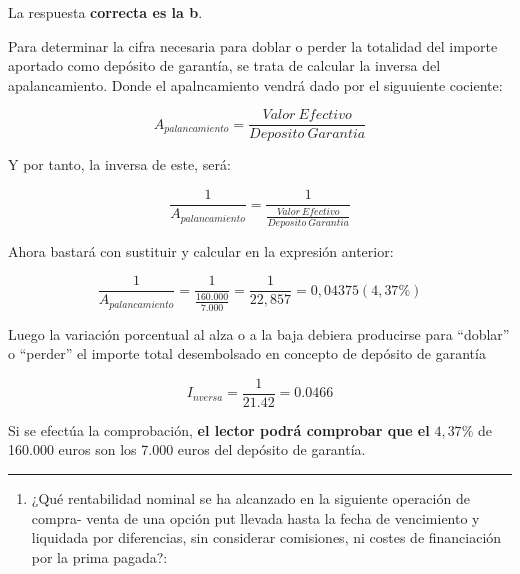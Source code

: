 \documentclass[
  letterpaper,
  DIV=11,
  numbers=noendperiod]{scrreprt}
\providecommand{\tightlist}{%
  \setlength{\itemsep}{0pt}\setlength{\parskip}{0pt}}\usepackage{longtable,booktabs,array}
\begin{document}
\begin{tcolorbox}[enhanced jigsaw, left=2mm, opacityback=0, colback=white, breakable, arc=.35mm, bottomrule=.15mm, rightrule=.15mm, toprule=.15mm, leftrule=.75mm, colframe=quarto-callout-tip-color-frame]
\begin{minipage}[t]{5.5mm}
\textcolor{quarto-callout-tip-color}{\faLightbulb}
\end{minipage}%
\begin{minipage}[t]{\textwidth - 5.5mm}

La respuesta \textbf{correcta es la b}.

Para determinar la cifra necesaria para doblar o perder la totalidad del
importe aportado como depósito de garantía, se trata de calcular la
inversa del apalancamiento. Donde el apalncamiento vendrá dado por el
siguuiente cociente:

\[A_{palancamiento}=\frac{Valor\ Efectivo}{Deposito\ Garantia}\]

Y por tanto, la inversa de este, será:

\[\frac {1}{A_{palancamiento}}=\frac {1}{\frac{Valor\ Efectivo}{Deposito\ Garantia}}\]

Ahora bastará con sustituir y calcular en la expresión anterior:

\[\frac {1}{A_{palancamiento}}=\frac {1}{\frac{160.000}{7.000}}=\frac{1}{22,857}=0,04375(4,37\%)\]

Luego la variación porcentual al alza o a la baja debiera producirse
para ``doblar'' o ``perder'' el importe total desembolsado en concepto
de depósito de garantía

\[I_{nversa}=\frac{1}{21.42}=0.0466\]

Si se efectúa la comprobación, \textbf{el lector podrá comprobar que el}
\(4,37\%\) de 160.000 euros son los 7.000 euros del depósito de
garantía.

\end{minipage}%
\end{tcolorbox}

\begin{center}\rule{0.5\linewidth}{0.5pt}\end{center}

\begin{enumerate}
\def\labelenumi{\arabic{enumi}.}
\setcounter{enumi}{47}
\tightlist
\item
  ¿Qué rentabilidad nominal se ha alcanzado en la siguiente operación de
  compra- venta de una opción put llevada hasta la fecha de vencimiento
  y liquidada por diferencias, sin considerar comisiones, ni costes de
  financiación por la prima pagada?:
\end{enumerate}
\end{document}
